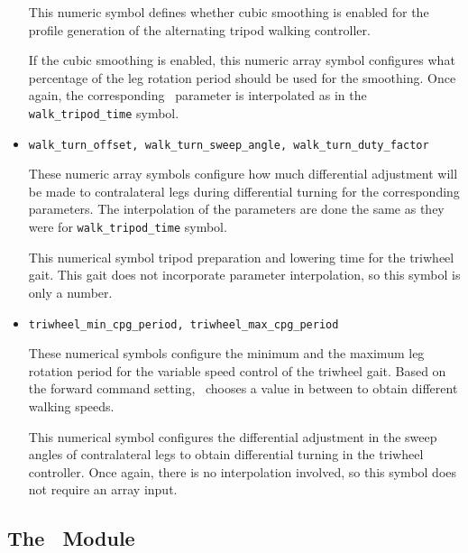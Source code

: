 \begin{itemize}
This numeric symbol defines whether cubic smoothing is enabled for the
profile generation of the alternating tripod walking controller.

\par
If the cubic smoothing is enabled, this numeric array symbol configures what
percentage of the leg rotation period should be used for the smoothing. Once
again, the corresponding \WalkMachine\ parameter is interpolated as in the
{\tt walk\_tripod\_time} symbol.

\item{\tt walk\_turn\_offset, walk\_turn\_sweep\_angle,
    walk\_turn\_duty\_factor}\par
{}
These numeric array symbols configure how much differential adjustment will
be made to contralateral legs during differential turning for the
corresponding parameters.  The interpolation of the parameters
are done the same as they were for {\tt walk\_tripod\_time} symbol.

\par
This numerical symbol tripod preparation and lowering time for the triwheel
gait. This gait does not incorporate parameter interpolation, so this symbol
is only a number.

\item{\tt triwheel\_min\_cpg\_period, triwheel\_max\_cpg\_period}\par
{}
These numerical symbols configure the minimum and the maximum leg rotation
period for the variable speed control of the triwheel gait. Based on the
forward command setting, \RHexWalker\ chooses a value in between to obtain
different walking speeds.

\par
This numerical symbol configures the differential adjustment in the sweep
angles of contralateral legs to obtain differential turning in the triwheel
controller. Once again, there is no interpolation involved, so this symbol
does not require an array input.
\end{itemize}

\subsection{The \StandMachine\ Module}
\label{sec:stand_machine}

